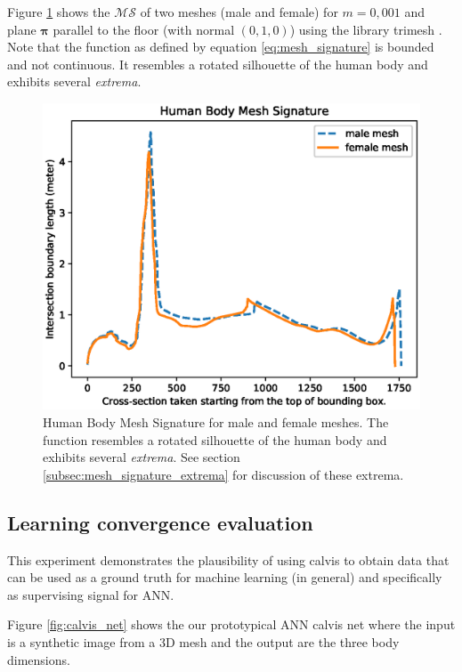 \documentclass[runningheads, orivec]{llncs}
\begin{document}
Figure \ref{fig:qualitative_eval} shows the $\mathcal{MS}$ of two meshes (male 
and female) for 
$m=0,001$ and plane $\boldsymbol{\pi}$ parallel to the floor (with normal $(0, 
1,0)$) using the library trimesh \cite{trimesh}. Note that the function as 
defined by equation \ref{eq:mesh_signature} is bounded and not continuous. It 
resembles a rotated silhouette of the human body and exhibits several 
\textit{extrema}.

\begin{figure}[h]
	\begin{center}
		\includegraphics[width=\linewidth]{Figure_1.eps}
	\end{center}
	\caption{Human Body Mesh Signature for male and female meshes. The 
		function resembles a rotated silhouette of the human body and exhibits 
		several \textit{extrema}. See section 
		\ref{subsec:mesh_signature_extrema} for discussion of these extrema.}
	\label{fig:qualitative_eval}
\end{figure}

\subsection{Learning convergence evaluation}\label{subsec:learn_conv}
This experiment demonstrates the plausibility of using calvis to obtain data 
that can be used as a ground truth for machine learning (in general) and 
specifically as supervising signal for ANN.

Figure \ref{fig:calvis_net} shows the our prototypical ANN calvis net where the 
input is a synthetic image from a 3D mesh and the output are the three body 
dimensions.
\end{document}
